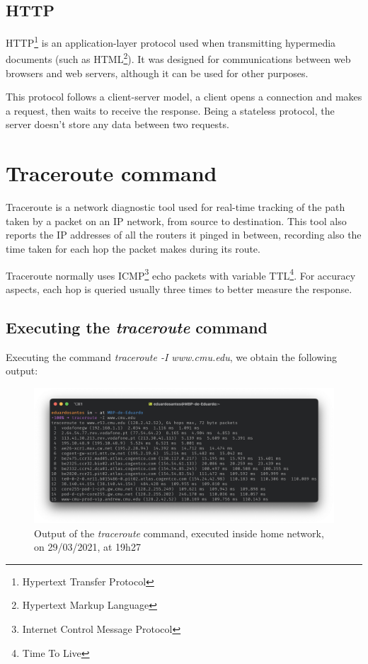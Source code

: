 \documentclass{article}
\newcommand\tab[1][1cm]{\hspace*{#1}}
\begin{document}
\subsection{HTTP}

\tab HTTP\footnote{Hypertext Transfer Protocol} is an application-layer protocol used when transmitting hypermedia documents (such as HTML\footnote{Hypertext Markup Language}). It was designed for communications between web browsers and web servers, although it can be used for other purposes. 

This protocol follows a client-server model, a client opens a connection and makes a request, then waits to receive the response. Being a stateless protocol, the server doesn't store any data between two requests.

\section{Traceroute command}

\tab Traceroute is a network diagnostic tool used for real-time tracking of the path taken by a packet on an IP network, from source to destination. This tool also reports the IP addresses of all the routers it pinged in between, recording also the time taken for each hop the packet makes during its route.

Traceroute normally uses ICMP\footnote{Internet Control Message Protocol} echo packets with variable TTL\footnote{Time To Live}. For accuracy aspects, each hop is queried usually three times to better measure the response. 

\newpage

\subsection{Executing the \textit{traceroute} command}

\tab Executing the command \textit{traceroute -I www.cmu.edu}, we obtain the following output:

\begin{figure}[H]
    \includegraphics[width=1 \textwidth]{images/tracerouteHome.png}
    \caption{Output of the \textit{traceroute} command, executed inside home network, on 29/03/2021, at 19h27}
\end{figure}
\end{document}
